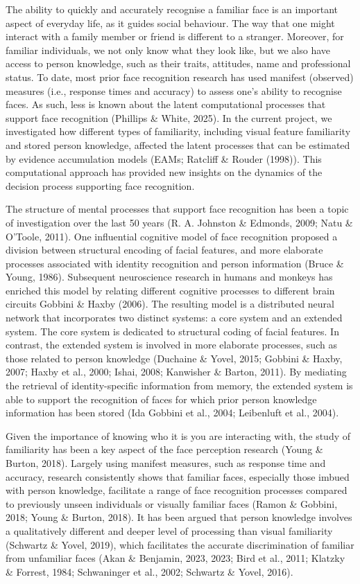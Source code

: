 \documentclass[
  letterpaper,
  DIV=11,
  numbers=noendperiod]{scrartcl}
\begin{document}
The ability to quickly and accurately recognise a familiar face is an
important aspect of everyday life, as it guides social behaviour. The
way that one might interact with a family member or friend is different
to a stranger. Moreover, for familiar individuals, we not only know what
they look like, but we also have access to person knowledge, such as
their traits, attitudes, name and professional status. To date, most
prior face recognition research has used manifest (observed) measures
(i.e., response times and accuracy) to assess one's ability to recognise
faces. As such, less is known about the latent computational processes
that support face recognition (Phillips \& White, 2025). In the current
project, we investigated how different types of familiarity, including
visual feature familiarity and stored person knowledge, affected the
latent processes that can be estimated by evidence accumulation models
(EAMs; Ratcliff \& Rouder (1998)). This computational approach has
provided new insights on the dynamics of the decision process supporting
face recognition.

The structure of mental processes that support face recognition has been
a topic of investigation over the last 50 years (R. A. Johnston \&
Edmonds, 2009; Natu \& O'Toole, 2011). One influential cognitive model
of face recognition proposed a division between structural encoding of
facial features, and more elaborate processes associated with identity
recognition and person information (Bruce \& Young, 1986). Subsequent
neuroscience research in humans and monkeys has enriched this model by
relating different cognitive processes to different brain circuits
Gobbini \& Haxby (2006). The resulting model is a distributed neural
network that incorporates two distinct systems: a core system and an
extended system. The core system is dedicated to structural coding of
facial features. In contrast, the extended system is involved in more
elaborate processes, such as those related to person knowledge (Duchaine
\& Yovel, 2015; Gobbini \& Haxby, 2007; Haxby et al., 2000; Ishai, 2008;
Kanwisher \& Barton, 2011). By mediating the retrieval of
identity-specific information from memory, the extended system is able
to support the recognition of faces for which prior person knowledge
information has been stored (Ida Gobbini et al., 2004; Leibenluft et
al., 2004).

Given the importance of knowing who it is you are interacting with, the
study of familiarity has been a key aspect of the face perception
research (Young \& Burton, 2018). Largely using manifest measures, such
as response time and accuracy, research consistently shows that familiar
faces, especially those imbued with person knowledge, facilitate a range
of face recognition processes compared to previously unseen individuals
or visually familiar faces (Ramon \& Gobbini, 2018; Young \& Burton,
2018). It has been argued that person knowledge involves a qualitatively
different and deeper level of processing than visual familiarity
(Schwartz \& Yovel, 2019), which facilitates the accurate discrimination
of familiar from unfamiliar faces (Akan \& Benjamin, 2023, 2023; Bird et
al., 2011; Klatzky \& Forrest, 1984; Schwaninger et al., 2002; Schwartz
\& Yovel, 2016).
\end{document}
